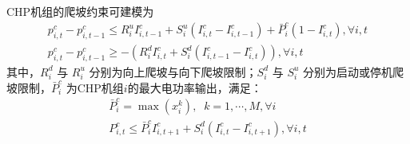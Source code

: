 CHP机组的爬坡约束可建模为\cite{UC-Model-06, CHP-Model-CXY-15, IES-Model-CXY-18}
\begin{subequations}
\begin{gather}
p_{i,t}^c - p_{i,t - 1}^c \le R_i^uI_{i,t - 1}^c + S_i^u(I_{i,t}^c - I_{i,t - 1}^c) + \bar P_i^c(1 - I_{i,t}^c), \forall i,t \\
p_{i,t}^c - p_{i,t - 1}^c \ge  - (R_i^dI_{i,t}^c + S_i^d(I_{i,t - 1}^c - I_{i,t}^c)), \forall i,t
\end{gather}
\end{subequations}
其中，$R_i^d$ 与 $R_i^u$ 分别为向上爬坡与向下爬坡限制；$S_i^d$ 与 $S_i^u$ 分别为启动或停机爬坡限制，$\bar P_i^c$  为CHP机组$i$的最大电功率输出，满足：
\cite{IES-Model-CXY-18}
\begin{subequations}
\begin{gather}
\bar P_i^c = \max (x_i^k),\;\;k = 1,\cdots,M, \forall i\\
P_{i,t}^c \le \bar P_i^cI_{i,t + 1}^c + S_i^d(I_{i,t}^c - I_{i,t + 1}^c), \forall i,t
\end{gather}
\end{subequations}

